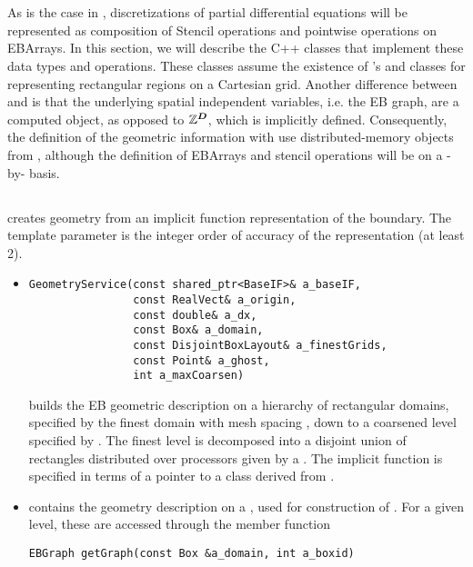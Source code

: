 \documentclass[12pt]{article}
\begin{document}
\section{} 

As is the case in , discretizations of partial differential equations will be represented as composition of Stencil operations and pointwise operations on EBArrays. In this section, we will describe the C++ classes that implement these data types and operations. These classes assume the existence of 's  and  classes for representing rectangular regions on a Cartesian grid. Another difference between  and  is that the underlying spatial independent variables, i.e. the EB graph, are a computed object, as opposed to $\mathbb{Z}^{\boldsymbol{D}}$, which is implicitly defined. Consequently, the definition of the geometric information with use distributed-memory objects from , although the definition of EBArrays and stencil operations will be on a -by- basis. 

\subsection{}
 creates geometry from an implicit function representation of the boundary. The template parameter  is the integer order of accuracy of the representation (at least 2). 
\begin{itemize}
\item
\begin{verbatim}
GeometryService(const shared_ptr<BaseIF>& a_baseIF,
                const RealVect& a_origin,
                const double& a_dx,
                const Box& a_domain,
                const DisjointBoxLayout& a_finestGrids,
                const Point& a_ghost,
                int a_maxCoarsen)
\end{verbatim}
builds the EB geometric description on a hierarchy of rectangular domains, specified by the finest domain  with mesh spacing , down to a coarsened level specified by . The finest level is decomposed into a disjoint union of rectangles distributed over processors given by a  . The implicit function is specified in terms of a pointer to a class derived from . 
\item
{} contains the geometry description on a , used for construction of . For a given level, these are accessed through the  member function 
\begin{verbatim} 
EBGraph getGraph(const Box &a_domain, int a_boxid)
\end{verbatim}
\end{itemize}
\end{document}
